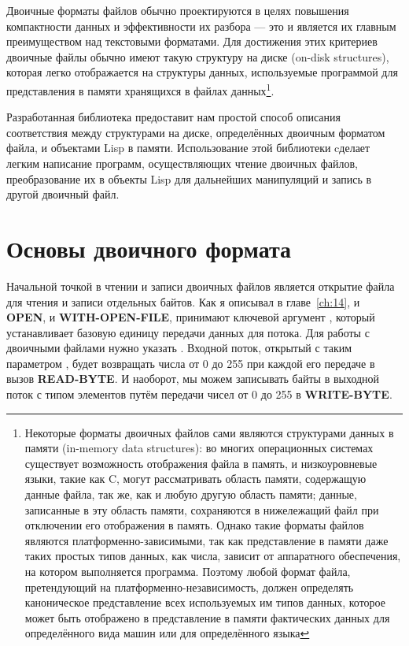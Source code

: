 Двоичные форматы файлов обычно проектируются в целях повышения компактности данных и
эффективности их разбора --- это и является их главным преимуществом над текстовыми
форматами. Для достижения этих критериев двоичные файлы обычно имеют такую структуру на
диске (on-disk structures), которая легко отображается на структуры данных, используемые
программой для представления в памяти хранящихся в файлах данных\footnote{Некоторые
  форматы двоичных файлов сами являются структурами данных в памяти (in-memory data
  structures): во многих операционных системах существует возможность отображения файла в
  память, и низкоуровневые языки, такие как C, могут рассматривать область памяти,
  содержащую данные файла, так же, как и любую другую область памяти; данные, записанные в
  эту область памяти, сохраняются в нижележащий файл при отключении его отображения в
  память. Однако такие форматы файлов являются платформенно-зависимыми, так как
  представление в памяти даже таких простых типов данных, как числа, зависит от
  аппаратного обеспечения, на котором выполняется программа. Поэтому любой формат файла,
  претендующий на платформенно-независимость, должен определять каноническое представление
  всех используемых им типов данных, которое может быть отображено в представление в
  памяти фактических данных для определённого вида машин или для определённого языка}.

Разработанная библиотека предоставит нам простой способ описания соответствия между
структурами на диске, определённых двоичным форматом файла, и объектами Lisp в
памяти. Использование этой библиотеки cделает легким написание программ, осуществляющих
чтение двоичных файлов, преобразование их в объекты Lisp для дальнейших манипуляций и
запись в другой двоичный файл.

\section{Основы двоичного формата}

Начальной точкой в чтении и записи двоичных файлов является открытие файла для чтения и
записи отдельных байтов. Как я описывал в главе~\ref{ch:14}, и \textbf{OPEN}, и
\textbf{WITH-OPEN-FILE}, принимают ключевой аргумент , который
устанавливает базовую единицу передачи данных для потока. Для работы с двоичными файлами
нужно указать . Входной поток, открытый с таким параметром
, будет возвращать числа от 0 до 255 при каждой его передаче в вызов
\textbf{READ-BYTE}. И наоборот, мы можем записывать байты в выходной поток с типом
элементов  путём передачи чисел от 0 до 255 в \textbf{WRITE-BYTE}.

